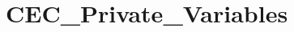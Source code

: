 \hypertarget{group___c_e_c___private___variables}{}\section{C\+E\+C\+\_\+\+Private\+\_\+\+Variables}
\label{group___c_e_c___private___variables}
